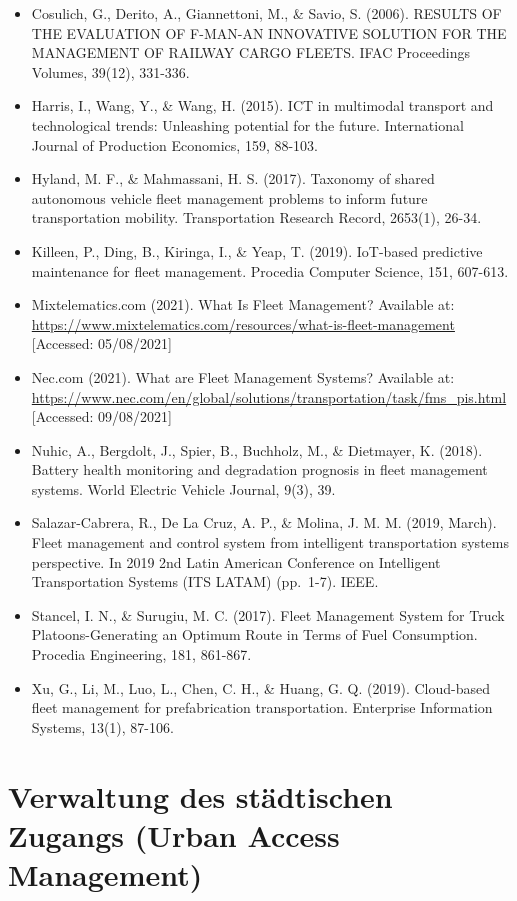 \documentclass[
]{book}
\providecommand{\tightlist}{%
  \setlength{\itemsep}{0pt}\setlength{\parskip}{0pt}}
\begin{document}
\begin{itemize}
\tightlist
\item
  Cosulich, G., Derito, A., Giannettoni, M., \& Savio, S. (2006). RESULTS OF THE EVALUATION OF F-MAN-AN INNOVATIVE SOLUTION FOR THE MANAGEMENT OF RAILWAY CARGO FLEETS. IFAC Proceedings Volumes, 39(12), 331-336.
\item
  Harris, I., Wang, Y., \& Wang, H. (2015). ICT in multimodal transport and technological trends: Unleashing potential for the future. International Journal of Production Economics, 159, 88-103.
\item
  Hyland, M. F., \& Mahmassani, H. S. (2017). Taxonomy of shared autonomous vehicle fleet management problems to inform future transportation mobility. Transportation Research Record, 2653(1), 26-34.
\item
  Killeen, P., Ding, B., Kiringa, I., \& Yeap, T. (2019). IoT-based predictive maintenance for fleet management. Procedia Computer Science, 151, 607-613.
\item
  Mixtelematics.com (2021). What Is Fleet Management? Available at: \url{https://www.mixtelematics.com/resources/what-is-fleet-management} {[}Accessed: 05/08/2021{]}
\item
  Nec.com (2021). What are Fleet Management Systems? Available at: \url{https://www.nec.com/en/global/solutions/transportation/task/fms_pis.html} {[}Accessed: 09/08/2021{]}
\item
  Nuhic, A., Bergdolt, J., Spier, B., Buchholz, M., \& Dietmayer, K. (2018). Battery health monitoring and degradation prognosis in fleet management systems. World Electric Vehicle Journal, 9(3), 39.
\item
  Salazar-Cabrera, R., De La Cruz, A. P., \& Molina, J. M. M. (2019, March). Fleet management and control system from intelligent transportation systems perspective. In 2019 2nd Latin American Conference on Intelligent Transportation Systems (ITS LATAM) (pp.~1-7). IEEE.
\item
  Stancel, I. N., \& Surugiu, M. C. (2017). Fleet Management System for Truck Platoons-Generating an Optimum Route in Terms of Fuel Consumption. Procedia Engineering, 181, 861-867.
\item
  Xu, G., Li, M., Luo, L., Chen, C. H., \& Huang, G. Q. (2019). Cloud-based fleet management for prefabrication transportation. Enterprise Information Systems, 13(1), 87-106.
\end{itemize}

\hypertarget{urban_access}{%
\section{Verwaltung des städtischen Zugangs (Urban Access Management)}\label{urban_access}}
\end{document}

